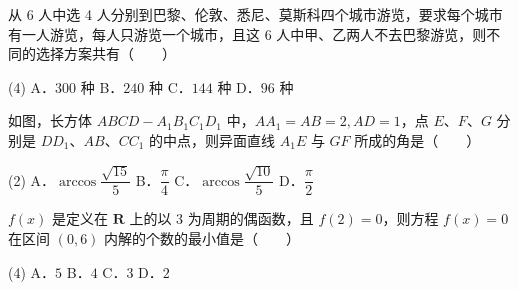 \begin{question}
从 6 人中选 4 人分别到巴黎、伦敦、悉尼、莫斯科四个城市游览，要求每个城市有一人游览，每人只游览一个城市，且这 6 人中甲、乙两人不去巴黎游览，则不同的选择方案共有\mbox{（　　）}

\begin{gkopts}(4)
\task A．$300$ 种
\task B．$240$ 种
\task C．$144$ 种
\task D．$96$ 种
\end{gkopts}

\Needspace{0.4\textheight}
\end{question}
\begin{question}
如图，长方体 $ABCD - A_1B_1C_1D_1$ 中，$AA_1 = AB = 2, AD = 1$，点 $E$、$F$、$G$ 分别是 $DD_1$、$AB$、$CC_1$ 的中点，则异面直线 $A_1E$ 与 $GF$ 所成的角是\mbox{（　　）}
\nopagebreak[4]
\begin{center}\end{center}
\nopagebreak[4]
\begin{gkopts}(2)
\task A．$\arccos\dfrac{\sqrt{15}}{5}$
\task B．$\dfrac{\pi}{4}$
\task C．$\arccos\dfrac{\sqrt{10}}{5}$
\task D．$\dfrac{\pi}{2}$
\end{gkopts}

\end{question}
\begin{question}
$f(x)$ 是定义在 $\mathbf{R}$ 上的以 $3$ 为周期的偶函数，且 $f(2) = 0$，则方程 $f(x) = 0$ 在区间 $(0, 6)$ 内解的个数的最小值是\mbox{（　　）}

\begin{gkopts}(4)
\task A．$5$
\task B．$4$
\task C．$3$
\task D．$2$
\end{gkopts}

\end{question}

